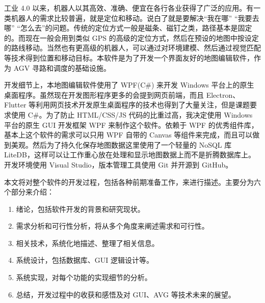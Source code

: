 
工业 4.0 以来，机器人以其高效、准确、便宜在各行各业获得了广泛的应用。有一类机器人的需求比较普遍，就是定位和移动。说白了就是要解决``我在哪'' ``我要去哪'' ``怎么去''的问题。传统的定位方式一般是磁条、磁钉之类，路径基本是固定的。而现在一般会用到类似 GPS 的高级的定位方式，然后在预设的地图中按设定的路线移动。当然也有更高级的机器人，可以通过对环境建模、然后通过视觉匹配等技术得到位置和移动目标。本软件是为了开发一个界面友好的地图编辑软件，作为 AGV 寻路和调度的基础设施。

开发细节上，本地图编辑软件使用了 WPF(C\#) 来开发 Windows 平台上的原生桌面程序。虽然现在开发图形程序更多的会提到网页前端，而且 Electron、Flutter 等利用网页技术开发原生桌面程序的技术也得到了大量关注，但是课题要求使用 C\#。为了防止 HTML/CSS/JS 代码的比重过高，我决定使用 Windows 平台的原生 GUI 开发框架 WPF 来制作这个软件。依赖于 WPF 的优秀组件库，基本上这个软件的需求可以只用 WPF 自带的 Canvas 等组件来完成，而且可以做到美观。然后为了持久化保存地图数据这里使用了一个轻量的 NoSQL 库 LiteDB，这样可以让工作重心放在处理和显示地图数据上而不是折腾数据库上。开发环境使用 Visual Studio，版本管理工具使用 Git 并开源到 GitHub。

本文将对整个软件的开发过程，包括各种前期准备工作，来进行描述。主要分为六个部分来介绍：

\begin{enumerate}
  \item 绪论，包括软件开发的背景和研究现状。
  \item 需求分析和可行性分析，将从多个角度来阐述需求和可行性。
  \item 相关技术，系统化地描述、整理了相关信息。
  \item 系统设计，包括数据库、GUI 逻辑设计等。
  \item 系统实现，对每个功能的实现细节的分析。
  \item 总结，开发过程中的收获和感悟及对 GUI、AVG 等技术未来的展望。
\end{enumerate}
